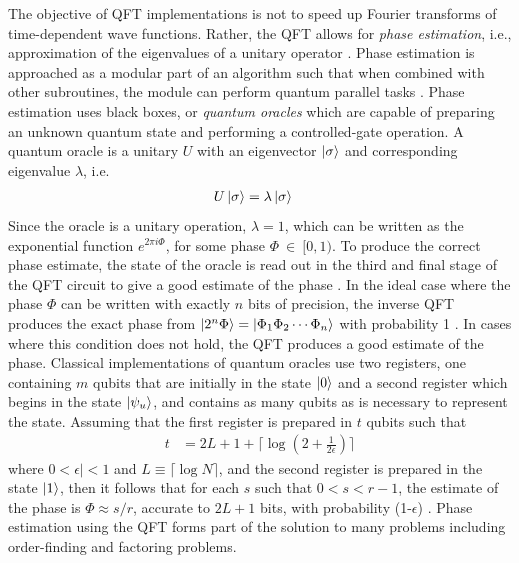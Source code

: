 The objective of QFT implementations is not to speed up Fourier transforms of time-dependent wave functions. Rather, the QFT allows for \textit{phase estimation}, i.e., approximation of the eigenvalues of a unitary operator \cite{Nielsen2010}. Phase estimation is approached as a modular part of an algorithm such that when combined with other subroutines, the module can perform quantum parallel tasks \cite{Nielsen2010}. Phase estimation uses black boxes, or \textit{quantum oracles} which are capable of preparing an unknown quantum state and performing a controlled-gate operation. A quantum oracle is a unitary $U$ with an eigenvector $\ket{\sigma}$ and corresponding eigenvalue $\lambda$, i.e.
\begin{align}
	U\ket{\sigma} & = \lambda\ket{\sigma}\nonumber 
\end{align}
Since the oracle is a unitary operation, $\lambda = 1$, which can be written as the exponential function $e^{2\pi i \Phi}$, for some phase $\Phi~\in~[0,1)$. To produce the correct phase estimate, the state of the oracle is read out in the third and final stage of the QFT circuit to give a good estimate of the phase \cite{Nielsen2010}. In the ideal case where the phase $\Phi$ can be written with exactly $n$ bits of precision, the inverse QFT produces the exact phase from $\ket{2^n\Phi} = \ket{\Phi_1\Phi_2\cdots\Phi_n}$ with probability 1 \cite{DeWolf2019}. In cases where this condition does not hold, the QFT produces a good estimate of the phase. Classical implementations of quantum oracles use two registers, one containing $m$ qubits that are initially in the state $\ket{0}$ and a second register which begins in the state $\ket{\psi_u}$, and contains as many qubits as is necessary to represent the state. Assuming that the first register is prepared in $t$ qubits such that
\begin{align}\label{eqn:phase-estimation-t}
	t & = 2L + 1 + \lceil\log\left(2 + \frac{1}{2\epsilon}\right)\rceil
\end{align}
where $0<\epsilon|< 1$ and $L \equiv \lceil \log N\rceil$, and the second register is prepared in the state $\ket{1}$, then it follows that for each $s$ such that $0 < s < r - 1$, the estimate of the phase is $\Phi \approx s/r$, accurate to $2L+1$ bits, with probability (1-$\epsilon$) \cite{Nielsen2010}. Phase estimation using the QFT forms part of the solution to many problems including order-finding and factoring problems.

